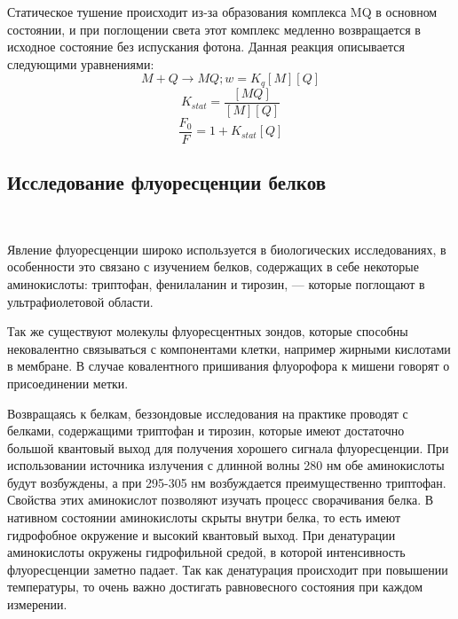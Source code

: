 \documentclass{article}
\begin{document}
\par Статическое тушение происходит из-за образования комплекса MQ в основном состоянии, и при поглощении света этот комплекс медленно возвращается в исходное состояние без испускания фотона. Данная реакция описывается следующими уравнениями:
\begin{equation}
    M + Q \xrightarrow{} MQ;   w = K_{q}[M][Q]
\end{equation}
\begin{equation}
    K_{stat} = \frac{[MQ]}{[M][Q]}
\end{equation}
\begin{equation}
    \frac{F_{0}}{F} = 1 + K_{stat}[Q]
\end{equation}
\subsection{Исследование флуоресценции белков}\
\par Явление флуоресценции широко используется в биологических исследованиях, в особенности это связано с изучением белков, содержащих в себе некоторые аминокислоты: триптофан, фенилаланин и тирозин, — которые поглощают в ультрафиолетовой области.
\par Так же существуют молекулы флуоресцентных зондов, которые способны нековалентно связываться с компонентами клетки, например жирными кислотами в мембране. В случае ковалентного пришивания флуорофора к мишени говорят о присоединении метки.
\par Возвращаясь к белкам, беззондовые исследования на практике проводят с белками, содержащими триптофан и тирозин, которые имеют достаточно большой квантовый выход для получения хорошего сигнала флуоресценции. При использовании источника излучения с длинной волны 280 нм обе аминокислоты будут возбуждены, а при 295-305 нм возбуждается преимущественно триптофан. Свойства этих аминокислот позволяют изучать процесс сворачивания белка. В нативном состоянии аминокислоты скрыты внутри белка, то есть имеют гидрофобное окружение и высокий квантовый выход. При денатурации аминокислоты окружены гидрофильной средой, в которой интенсивность флуоресценции заметно падает. Так как денатурация происходит при повышении температуры, то очень важно достигать равновесного состояния при каждом измерении. 
\end{document}
